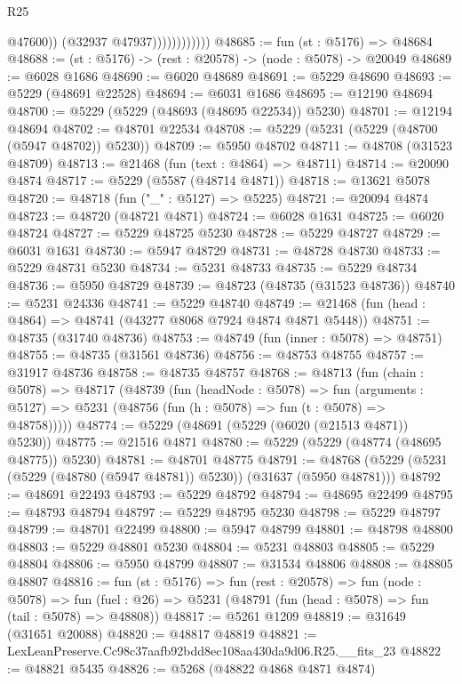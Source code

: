 \begin{lexlean}{R25}
\begin{coremodule}
                              @47600))
                          (@32937 @47937))))))))))))
@48685 := fun (st : @5176) => @48684
@48688 := (st : @5176) -> (rest : @20578) -> (node : @5078) -> @20049
@48689 := @6028 @1686
@48690 := @6020 @48689
@48691 := @5229 @48690
@48693 := @5229 (@48691 @22528)
@48694 := @6031 @1686
@48695 := @12190 @48694
@48700 := @5229 (@5229 (@48693 (@48695 @22534)) @5230)
@48701 := @12194 @48694
@48702 := @48701 @22534
@48708 := @5229 (@5231 (@5229 (@48700 (@5947 @48702)) @5230))
@48709 := @5950 @48702
@48711 := @48708 (@31523 @48709)
@48713 := @21468 (fun (text : @4864) => @48711)
@48714 := @20090 @4874
@48717 := @5229 (@5587 (@48714 @4871))
@48718 := @13621 @5078
@48720 := @48718 (fun ("_" : @5127) => @5225)
@48721 := @20094 @4874
@48723 := @48720 (@48721 @4871)
@48724 := @6028 @1631
@48725 := @6020 @48724
@48727 := @5229 @48725 @5230
@48728 := @5229 @48727
@48729 := @6031 @1631
@48730 := @5947 @48729
@48731 := @48728 @48730
@48733 := @5229 @48731 @5230
@48734 := @5231 @48733
@48735 := @5229 @48734
@48736 := @5950 @48729
@48739 := @48723 (@48735 (@31523 @48736))
@48740 := @5231 @24336
@48741 := @5229 @48740
@48749 := @21468 (fun (head : @4864) => @48741 (@43277 @8068 @7924 @4874 @4871 @5448))
@48751 := @48735 (@31740 @48736)
@48753 := @48749 (fun (inner : @5078) => @48751)
@48755 := @48735 (@31561 @48736)
@48756 := @48753 @48755
@48757 := @31917 @48736
@48758 := @48735 @48757
@48768 := @48713
    (fun (chain : @5078) =>
    @48717
      (@48739
        (fun (headNode : @5078) =>
        fun (arguments : @5127) => @5231 (@48756 (fun (h : @5078) => fun (t : @5078) => @48758)))))
@48774 := @5229 (@48691 (@5229 (@6020 (@21513 @4871)) @5230))
@48775 := @21516 @4871
@48780 := @5229 (@5229 (@48774 (@48695 @48775)) @5230)
@48781 := @48701 @48775
@48791 := @48768 (@5229 (@5231 (@5229 (@48780 (@5947 @48781)) @5230)) (@31637 (@5950 @48781)))
@48792 := @48691 @22493
@48793 := @5229 @48792
@48794 := @48695 @22499
@48795 := @48793 @48794
@48797 := @5229 @48795 @5230
@48798 := @5229 @48797
@48799 := @48701 @22499
@48800 := @5947 @48799
@48801 := @48798 @48800
@48803 := @5229 @48801 @5230
@48804 := @5231 @48803
@48805 := @5229 @48804
@48806 := @5950 @48799
@48807 := @31534 @48806
@48808 := @48805 @48807
@48816 := fun (st : @5176) =>
  fun (rest : @20578) =>
  fun (node : @5078) =>
  fun (fuel : @26) => @5231 (@48791 (fun (head : @5078) => fun (tail : @5078) => @48808))
@48817 := @5261 @1209
@48819 := @31649 (@31651 @20088)
@48820 := @48817 @48819
@48821 := LexLeanPreserve.Cc98c37aafb92bdd8ec108aa430da9d06.R25.__fits_23
@48822 := @48821 @5435
@48826 := @5268 (@48822 @4868 @4871 @4874)

\end{coremodule}
\end{lexlean}
